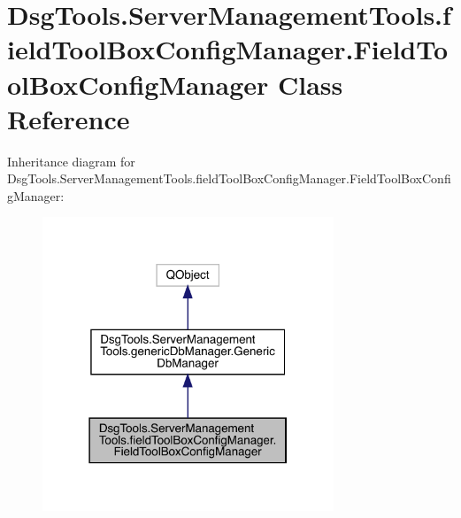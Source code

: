 \hypertarget{class_dsg_tools_1_1_server_management_tools_1_1field_tool_box_config_manager_1_1_field_tool_box_config_manager}{}\section{Dsg\+Tools.\+Server\+Management\+Tools.\+field\+Tool\+Box\+Config\+Manager.\+Field\+Tool\+Box\+Config\+Manager Class Reference}
\label{class_dsg_tools_1_1_server_management_tools_1_1field_tool_box_config_manager_1_1_field_tool_box_config_manager}


Inheritance diagram for Dsg\+Tools.\+Server\+Management\+Tools.\+field\+Tool\+Box\+Config\+Manager.\+Field\+Tool\+Box\+Config\+Manager\+:
\nopagebreak
\begin{figure}[H]
\begin{center}
\leavevmode
\includegraphics[width=247pt]{class_dsg_tools_1_1_server_management_tools_1_1field_tool_box_config_manager_1_1_field_tool_box_config_manager__inherit__graph}
\end{center}
\end{figure}


